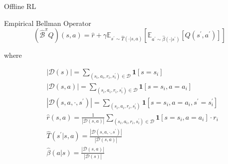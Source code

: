 \documentclass[11pt]{beamer}
\newcommand{\mbb}[1]{\mathbb{#1}}
\newcommand{\mb}[1]{\mathbf{#1}}
\newcommand{\mc}[1]{\mathcal{#1}}
\newcommand{\abs}[1]{\left\lvert #1 \right\rvert}
\begin{document}
\begin{frame}{Offline RL}
  \begin{block}{Empirical Bellman Operator}
    \[
      (\hat{\mc{B}}^\pi Q)(s,a) = \hat{r} + \gamma \mbb{E}_{s^\prime \sim \hat{T}(\cdot | s,a)}\left[\mbb{E}_{a^\prime \sim \hat{\beta}(\cdot |s^\prime)} \left[ Q(s^\prime,a^\prime) \right]\right]
    \]

    where

    \[
    \begin{aligned}
    &\abs{\mc{D}(s)} = \sum_{(s_i,a_i,r_i,s_i^\prime) \in \mc{D}}\mb{1}[s=s_i] \\
    &\abs{\mc{D}(s,a)} = \sum_{(s_i,a_i,r_i,s^\prime_i)\in\mc{D}}\mb{1}[s=s_i, a=a_i]\\
    &\abs{\mc{D}(s,a,\cdot, s^\prime)} = \sum_{(s_i, a_i, r_i, s^\prime_i)} \mb{1}[s=s_i, a=a_i, s^\prime=s_i^\prime] \\
    &\hat{r}(s,a) = \frac{1}{\abs{\mc{D}(s,a)}} \sum_{(s_i, a_i, r_i, s_i^\prime) \in \mc{D}}\mb{1}[s=s_i,a=a_i]\cdot r_i \\
    &\hat{T}(s^\prime|s,a) = \frac{\abs{\mc{D}(s,a,\cdot, s^\prime)}}{\abs{\mc{D}(s,a)}} \\
    &\hat{\beta}(a|s) = \frac{\abs{\mc{D}(s,a)}}{\abs{\mc{D}(s)}}
    \end{aligned}
    \]
  \end{block}
\end{frame}
\end{document}
